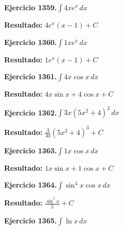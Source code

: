 \documentclass[10pt,a4paper]{article}
\begin{document}
\begin{ejbox}
\textbf{Ejercicio 1359.}\quad $\int 4x e^{x}\,dx$
\end{ejbox}

\begin{solbox}
\textbf{Resultado:} \(\displaystyle 4e^x(x-1) + C\)
\end{solbox}

\newpage
\begin{ejbox}
\textbf{Ejercicio 1360.}\quad $\int 1x e^{x}\,dx$
\end{ejbox}

\begin{solbox}
\textbf{Resultado:} \(\displaystyle 1e^x(x-1) + C\)
\end{solbox}

\begin{ejbox}
\textbf{Ejercicio 1361.}\quad $\int 4x \cos x\,dx$
\end{ejbox}

\begin{solbox}
\textbf{Resultado:} \(\displaystyle 4x\sin x + 4\cos x + C\)
\end{solbox}

\begin{ejbox}
\textbf{Ejercicio 1362.}\quad $\int 3x(5x^2 + 4)^{2}\,dx$
\end{ejbox}

\begin{solbox}
\textbf{Resultado:} \(\displaystyle \frac{3}{30}(5x^2+4)^{3} + C\)
\end{solbox}

\newpage
\begin{ejbox}
\textbf{Ejercicio 1363.}\quad $\int 1x \cos x\,dx$
\end{ejbox}

\begin{solbox}
\textbf{Resultado:} \(\displaystyle 1x\sin x + 1\cos x + C\)
\end{solbox}

\begin{ejbox}
\textbf{Ejercicio 1364.}\quad $\int \sin^{4}x \cos x\,dx$
\end{ejbox}

\begin{solbox}
\textbf{Resultado:} \(\displaystyle \frac{\sin^{5}x}{5} + C\)
\end{solbox}

\begin{ejbox}
\textbf{Ejercicio 1365.}\quad $\int \ln x\,dx$
\end{ejbox}
\end{document}
